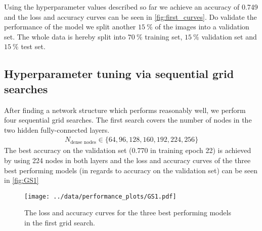Using the hyperparameter values described so far we achieve an accuracy of 0.749 and the loss and accuracy curves can be seen in \autoref{fig:first_curves}. 
Do validate the performance of the model we split another $\SI{15}{\percent}$ of the images into a validation set.
The whole data is hereby split into $\SI{70}{\percent}$ training set, $\SI{15}{\percent}$ validation set and $\SI{15}{\percent}$ test set.


\subsection{Hyperparameter tuning via sequential grid searches}
After finding a network structure which performs reasonably well, we perform four sequential grid searches.
The first search covers the number of nodes in the two hidden fully-connected layers.
\begin{align}
    N_\text{dense nodes} \in \{64, 96, 128, 160, 192, 224, 256\}
\end{align}
The best accuracy on the validation set (0.770 in training epoch 22) is achieved by using 224 nodes in both layers and the loss and accuracy curves of the three best performing models 
(in regards to accuracy on the validation set) can be seen in \autoref{fig:GS1}
\begin{figure}
    \centering
    \texttt{[image: ../data/performance\_plots/GS1.pdf]}
    \caption{The loss and accuracy curves for the three best performing models in the first grid search.}
    \label{fig:GS1}
\end{figure}

